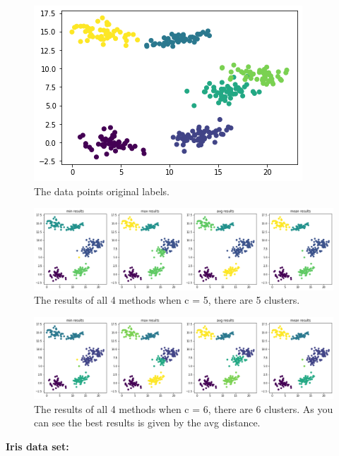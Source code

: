 \documentclass[12pt, a4paper]{paper}
\begin{document}
\begin{figure}[h!]
\centering
\includegraphics[scale=0.4]{hir_6_gaussians.png}
\caption{The data points original labels.}
\label{fig:hir_gus_1}
\end{figure}

\newpage

\begin{figure}[h!]
\centering
\includegraphics[scale=0.4]{hir_6_gaussians_5.png}
\caption{The results of all 4 methods when c = 5, there are 5 clusters.}
\label{fig:hir_gus_2}
\end{figure}


\begin{figure}[h!]
\centering
\includegraphics[scale=0.4]{hir_6_gaussians_6.png}
\caption{The results of all 4 methods when c = 6, there are 6 clusters. As you can see the best results is given by the avg distance.}
\label{fig:hir_gus_3}
\end{figure}



\textbf{Iris data set:}
\end{document}
